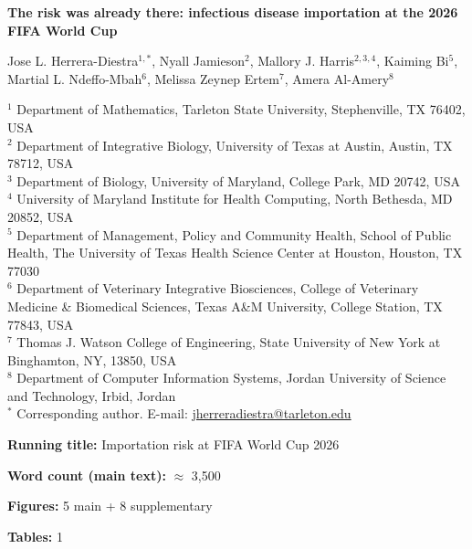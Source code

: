 \documentclass[12pt, a4paper]{article}
\begin{document}
\begin{titlepage}
\begin{center}
{\Large\bfseries The risk was already there: infectious disease
importation at the 2026 FIFA World Cup}

\vspace{1.5cm}

Jose L. Herrera-Diestra$^{1,*}$, Nyall Jamieson$^{2}$, Mallory J. Harris$^{2,3,4}$, Kaiming Bi$^{5}$, Martial L. Ndeffo-Mbah$^{6}$,  Melissa Zeynep Ertem$^{7}$, Amera Al-Amery$^{8}$

\vspace{0.5cm}

{\small
$^{1}$ Department of Mathematics, Tarleton State University, Stephenville, TX 76402, USA\\
$^{2}$ Department of Integrative Biology, University of Texas at Austin, Austin, TX 78712, USA\\
$^{3}$ Department of Biology, University of Maryland, College Park, MD 20742, USA\\
$^{4}$ University of Maryland Institute for Health Computing, North Bethesda, MD 20852, USA\\
$^{5}$ Department of Management, Policy and Community Health, School of Public Health, The University of Texas Health Science Center at Houston, Houston, TX 77030\\
$^{6}$ Department of Veterinary Integrative Biosciences, College of Veterinary Medicine \& Biomedical Sciences, Texas A\&M University, College Station, TX 77843, USA\\
$^{7}$ Thomas J. Watson College of Engineering, State University of New York at Binghamton, NY, 13850, USA\\
$^{8}$ Department of Computer Information Systems, Jordan University of Science and Technology, Irbid, Jordan\\
$^{*}$ Corresponding author.
E-mail: \href{mailto:jherreradiestra@tarleton.edu}{jherreradiestra@tarleton.edu}
}

\vspace{1cm}

\textbf{Running title:} Importation risk at FIFA World Cup 2026

\vspace{0.5cm}

\textbf{Word count (main text):} $\approx$ 3,500

\textbf{Figures:} 5 main + 8 supplementary

\textbf{Tables:} 1
\end{center}
\end{titlepage}
\end{document}

